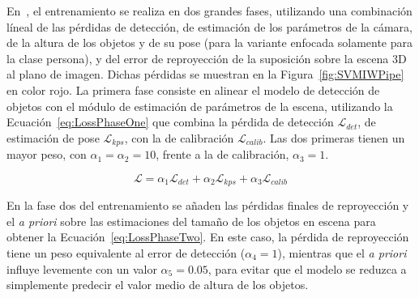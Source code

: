 En~\cite{SVMIW}, el entrenamiento se realiza en dos grandes fases, utilizando una combinación líneal de las pérdidas de detección,
de estimación de los parámetros de la cámara, de la altura de los objetos y de su pose (para la variante enfocada
solamente para la clase persona), y del error de reproyección de la suposición sobre la escena 3D al plano de imagen.
Dichas pérdidas se muestran en la Figura~\ref{fig:SVMIWPipe} en color rojo.
La primera fase consiste en alinear el modelo de detección de objetos con el módulo de estimación de parámetros de la
escena, utilizando la Ecuación~\ref{eq:LossPhaseOne} que combina la pérdida de detección $\mathcal{L}_{det}$, de estimación de
pose $\mathcal{L}_{kps}$, con la de calibración $\mathcal{L}_{calib}$. Las dos primeras tienen un mayor peso, con
$\alpha_1 = \alpha_2 = 10$, frente a la de calibración, $\alpha_3 = 1$.

\begin{equation}\label{eq:LossPhaseOne}
  \mathcal{L} = \alpha_1\mathcal{L}_{det} + \alpha_2\mathcal{L}_{kps} + \alpha_3\mathcal{L}_{calib}
\end{equation}

En la fase dos del entrenamiento se añaden las pérdidas finales de reproyección y el \emph{a priori} sobre las estimaciones del
tamaño de los objetos en escena para obtener la Ecuación~\ref{eq:LossPhaseTwo}. En este caso, la pérdida de reproyección tiene
un peso equivalente al error de detección ($\alpha_4 = 1$), mientras que el \emph{a priori} influye levemente con un valor $\alpha_5 = 0.05$, para evitar que el
modelo se reduzca a simplemente predecir el valor medio de altura de los objetos.

